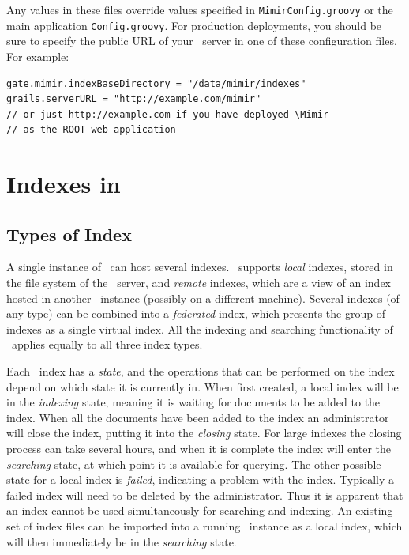 Any values in these files override values specified in {\tt MimirConfig.groovy}
or the main application {\tt Config.groovy}.  For production deployments, you
should be sure to specify the public URL of your \Mimir\ server in one of these
configuration files.  For example:
\begin{lstlisting}[texcl]
gate.mimir.indexBaseDirectory = "/data/mimir/indexes"
grails.serverURL = "http://example.com/mimir"
// or just http://example.com if you have deployed \Mimir
// as the ROOT web application
\end{lstlisting}


\section{Indexes in \Mimir}

\subsection{Types of Index}\label{sec:admin:index-types}

A single instance of \Mimir\ can host several indexes.  \Mimir\ supports
{\em local} indexes, stored in the file system of the \Mimir\ server, and
{\em remote} indexes, which are a view of an index hosted in another \Mimir\
instance (possibly on a different machine).  Several indexes (of any type) can
be combined into a {\em federated} index, which presents the group of indexes as
a single virtual index.  All the indexing and searching functionality of
\Mimir\ applies equally to all three index types.

Each \Mimir\ index has a {\em state}, and the operations that can be performed
on the index depend on which state it is currently in.  When first created, a
local index will be in the {\em indexing} state, meaning it is waiting for
documents to be added to the index.  When all the documents have been added to
the index an administrator will close the index, putting it into the {\em
closing} state.  For large indexes the closing process can take several hours,
and when it is complete the index will enter the {\em searching} state, at
which point it is available for querying.  The other possible state for a local
index is {\em failed}, indicating a problem with the index.  Typically a failed
index will need to be deleted by the administrator.  Thus it is apparent that
an index cannot be used simultaneously for searching and indexing.  An existing
set of index files can be imported into a running \Mimir\ instance as a local
index, which will then immediately be in the {\em searching} state.

